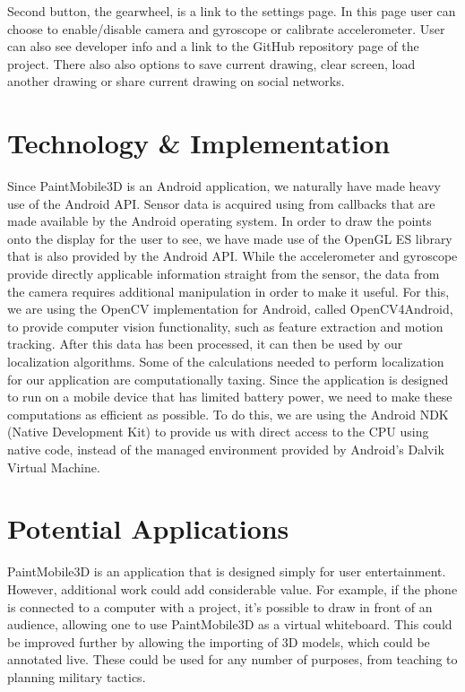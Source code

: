 \documentclass{chi-ext}
\begin{document}
Second button, the gearwheel, is a link to the settings page. In this page user can choose to enable/disable camera and gyroscope or calibrate accelerometer. User can also see developer info and a link to the GitHub repository page of the project. There also also options to save current drawing, clear screen, load another drawing or share current drawing on social networks.


\section{Technology \& Implementation}

Since PaintMobile3D is an Android application, we naturally have made heavy use of the Android API. Sensor data is acquired using from callbacks that are made available by the Android operating system. In order to draw the points onto the display for the user to see, we have made use of the OpenGL ES library that is also provided by the Android API. While the accelerometer and gyroscope provide directly applicable information straight from the sensor, the data from the camera requires additional manipulation in order to make it useful. For this, we are using the OpenCV implementation for Android, called OpenCV4Android, to provide computer vision functionality, such as feature extraction and motion tracking. After this data has been processed, it can then be used by our localization algorithms. Some of the calculations needed to perform localization for our application are computationally taxing. Since the application is designed to run on a mobile device that has limited battery power, we need to make these computations as efficient as possible. To do this, we are using the Android NDK (Native Development Kit) to provide us with direct access to the CPU using native code, instead of the managed environment provided by Android's Dalvik Virtual Machine.

\section{Potential Applications}

PaintMobile3D is an application that is designed simply for user entertainment. However, additional work could add
considerable value. For example, if the phone is connected to a computer with a project, it's possible to draw in front of an audience,
allowing one to use PaintMobile3D as a virtual whiteboard. This could be improved further by allowing the importing of
3D models, which could be annotated live. These could be used for any number of purposes, from teaching to planning military tactics.
\end{document}

